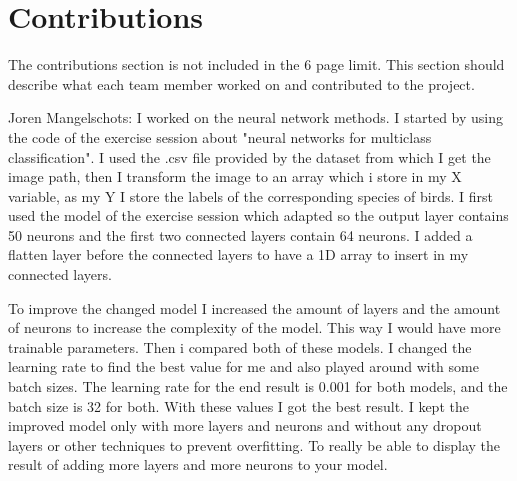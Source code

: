 \section{Contributions}
The contributions section is not included in the 6 page limit. This section should describe what each team member worked on and contributed to the project.

Joren Mangelschots: I worked on the neural network methods. I started by using the code of the exercise session about "neural networks for multiclass classification". I used the .csv file provided by the dataset from which I get the image path, then I transform the image to an array which i store in my X variable, as my Y I store the labels of the corresponding species of birds. I first used the model of the exercise session which adapted so the output layer contains 50 neurons and the first two connected layers contain 64 neurons. I added a flatten layer before the connected layers to have a 1D array to insert in my connected layers. 

To improve the changed model I increased the amount of layers and the amount of neurons to increase the complexity of the model. This way I would have more trainable parameters. Then i compared both of these models. I changed the learning rate to find the best value for me and also played around with some batch sizes. The learning rate for the end result is 0.001 for both models, and the batch size is 32 for both. With these values I got the best result. I kept the improved model only with more layers and neurons and without any dropout layers or other techniques to prevent overfitting. To really be able to display the result of adding more layers and more neurons to your model. 